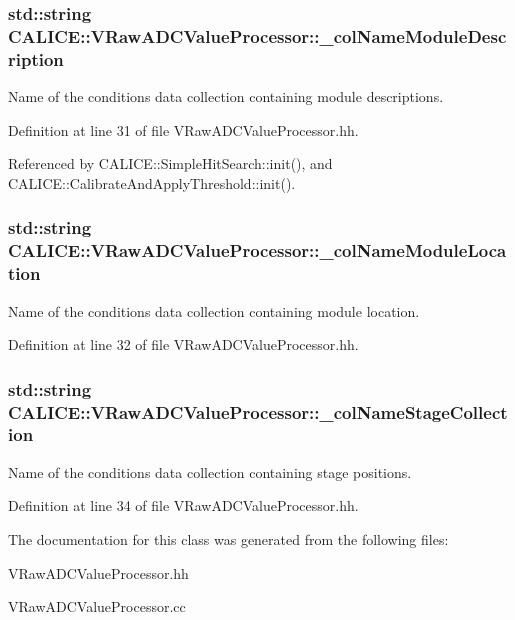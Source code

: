 \subsubsection[{\_\-colNameModuleDescription}]{\setlength{\rightskip}{0pt plus 5cm}std::string {\bf CALICE::VRawADCValueProcessor::\_\-colNameModuleDescription}\hspace{0.3cm}{\ttfamily  [protected]}}\label{classCALICE_1_1VRawADCValueProcessor_a7c7446a4e691d62dbeaaf09d64122af0}


Name of the conditions data collection containing module descriptions. 

Definition at line 31 of file VRawADCValueProcessor.hh.

Referenced by CALICE::SimpleHitSearch::init(), and CALICE::CalibrateAndApplyThreshold::init().
\subsubsection[{\_\-colNameModuleLocation}]{\setlength{\rightskip}{0pt plus 5cm}std::string {\bf CALICE::VRawADCValueProcessor::\_\-colNameModuleLocation}\hspace{0.3cm}{\ttfamily  [protected]}}\label{classCALICE_1_1VRawADCValueProcessor_a3b5a772ddae19bfabcaff86428defd1c}


Name of the conditions data collection containing module location. 

Definition at line 32 of file VRawADCValueProcessor.hh.
\subsubsection[{\_\-colNameStageCollection}]{\setlength{\rightskip}{0pt plus 5cm}std::string {\bf CALICE::VRawADCValueProcessor::\_\-colNameStageCollection}\hspace{0.3cm}{\ttfamily  [protected]}}\label{classCALICE_1_1VRawADCValueProcessor_a4af3c2f4f81070c495ea68090acb6386}


Name of the conditions data collection containing stage positions. 

Definition at line 34 of file VRawADCValueProcessor.hh.

The documentation for this class was generated from the following files:\begin{DoxyCompactItemize}
\item 
VRawADCValueProcessor.hh\item 
VRawADCValueProcessor.cc\end{DoxyCompactItemize}
